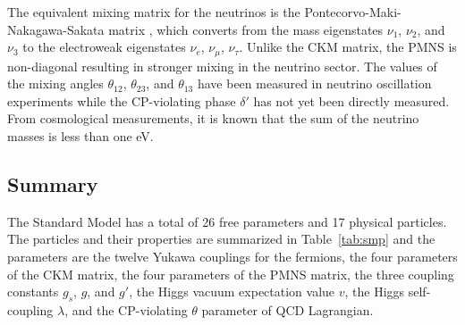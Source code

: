 The equivalent mixing matrix for the neutrinos is the Pontecorvo-Maki-Nakagawa-Sakata matrix \upmns, which  converts from the mass eigenstates $\nu_1$, $\nu_2$, and $\nu_3$ to the electroweak eigenstates $\nu_e$, $\nu_\mu$, $\nu_\tau$.
Unlike the CKM matrix, the PMNS is non-diagonal resulting in stronger mixing in the neutrino sector.
The values of the mixing angles $\theta_{12}$, $\theta_{23}$, and $\theta_{13}$ have been measured in neutrino oscillation experiments while the CP-violating phase $\delta'$ has not yet been directly measured.
From cosmological measurements, %
it is known that the sum of the neutrino masses is less than one eV. 

\newpage

\subsection{Summary}

The Standard Model has a total of 26 free parameters and 17 physical particles.
The particles and their properties are summarized in Table~\ref{tab:smp} and the parameters are  
the twelve Yukawa couplings for the fermions,
the four parameters of the CKM matrix,
the four parameters of the PMNS matrix,
the three coupling constants $g_s$, $g$, and $g'$,
the Higgs vacuum expectation value $v$,
the Higgs self-coupling $\lambda$,
and the CP-violating $\theta$ parameter of QCD Lagrangian.

